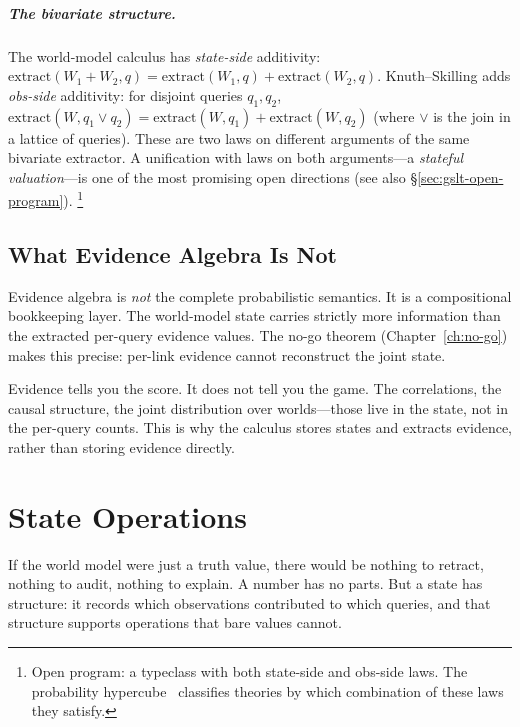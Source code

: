 \documentclass[11pt,openany]{report}
\begin{document}
\paragraph{The bivariate structure.}
The world-model calculus has \emph{state-side} additivity:
$\mathrm{extract}(W_1 + W_2, q) = \mathrm{extract}(W_1, q) +
\mathrm{extract}(W_2, q)$.  Knuth--Skilling adds \emph{obs-side}
additivity: for disjoint queries $q_1, q_2$,
$\mathrm{extract}(W, q_1 \vee q_2) =
\mathrm{extract}(W, q_1) + \mathrm{extract}(W, q_2)$
(where $\vee$ is the join in a lattice of queries).
These are two laws on different arguments of the same bivariate
extractor.  A unification with laws on both arguments---a
\emph{stateful valuation}---is one of the most promising open
directions (see also \S\ref{sec:gslt-open-program}).%
\footnote{Open program: a  typeclass with
both state-side and obs-side laws.  The probability
hypercube~\cite{StayWells2026} classifies theories by which
combination of these laws they satisfy.}


\section{What Evidence Algebra Is Not}

Evidence algebra is \emph{not} the complete probabilistic semantics.
It is a compositional bookkeeping layer.  The world-model state
carries strictly more information than the extracted per-query evidence
values.  The no-go theorem (Chapter~\ref{ch:no-go}) makes this
precise: per-link evidence cannot reconstruct the joint state.

Evidence tells you the score.  It does not tell you the game.
The correlations, the causal structure, the joint distribution over
worlds---those live in the state, not in the per-query counts.  This
is why the calculus stores states and extracts evidence, rather than
storing evidence directly.


\chapter{State Operations}
\label{ch:state-ops}

If the world model were just a truth value, there would be nothing to
retract, nothing to audit, nothing to explain.  A number has no parts.
But a state has structure: it records which observations contributed to
which queries, and that structure supports operations that bare values
cannot.
\end{document}
